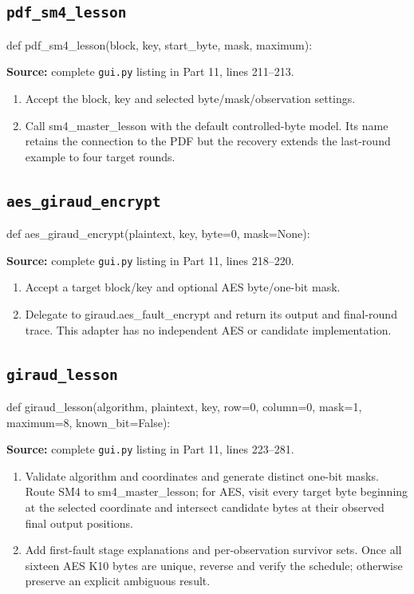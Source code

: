 \subsection{\texttt{pdf\_\allowbreak{}sm4\_\allowbreak{}lesson}}
\begin{lightcode}
def pdf_sm4_lesson(block, key, start_byte, mask, maximum):
\end{lightcode}
\noindent\textbf{Source:} complete \texttt{gui.py} listing in Part 11, lines 211--213.
\begin{enumerate}
\item Accept the block, key and selected byte/mask/observation settings.
\item Call sm4\_master\_lesson with the default controlled-byte model. Its name retains the connection to the PDF but the recovery extends the last-round example to four target rounds.
\end{enumerate}
\subsection{\texttt{aes\_\allowbreak{}giraud\_\allowbreak{}encrypt}}
\begin{lightcode}
def aes_giraud_encrypt(plaintext, key, byte=0, mask=None):
\end{lightcode}
\noindent\textbf{Source:} complete \texttt{gui.py} listing in Part 11, lines 218--220.
\begin{enumerate}
\item Accept a target block/key and optional AES byte/one-bit mask.
\item Delegate to giraud.aes\_fault\_encrypt and return its output and final-round trace. This adapter has no independent AES or candidate implementation.
\end{enumerate}
\subsection{\texttt{giraud\_\allowbreak{}lesson}}
\begin{lightcode}
def giraud_lesson(algorithm, plaintext, key, row=0, column=0, mask=1, maximum=8, known_bit=False):
\end{lightcode}
\noindent\textbf{Source:} complete \texttt{gui.py} listing in Part 11, lines 223--281.
\begin{enumerate}
\item Validate algorithm and coordinates and generate distinct one-bit masks. Route SM4 to sm4\_master\_lesson; for AES, visit every target byte beginning at the selected coordinate and intersect candidate bytes at their observed final output positions.
\item Add first-fault stage explanations and per-observation survivor sets. Once all sixteen AES K10 bytes are unique, reverse and verify the schedule; otherwise preserve an explicit ambiguous result.
\end{enumerate}
